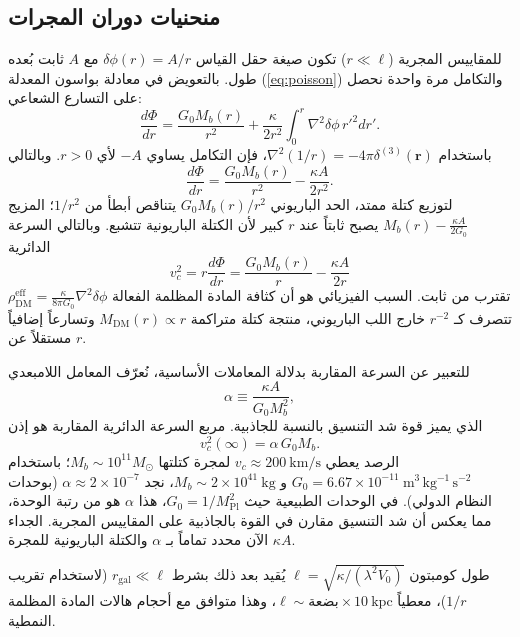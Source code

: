 \documentclass[12pt,a4paper]{article}
\begin{document}
	\subsection{منحنيات دوران المجرات}
	للمقاييس المجرية (\(r \ll \ell\)) تكون صيغة حقل القياس \(\delta\phi(r) = A/r\) مع \(A\) ثابت بُعده طول. بالتعويض في معادلة بواسون المعدلة (\ref{eq:poisson}) والتكامل مرة واحدة نحصل على التسارع الشعاعي:
	\[
	\frac{d\Phi}{dr} = \frac{G_0 M_b(r)}{r^2} + \frac{\kappa}{2r^2} \int_0^r \nabla^2\delta\phi \, r'^2 dr'.
	\]
	باستخدام \(\nabla^2(1/r) = -4\pi\delta^{(3)}(\mathbf{r})\)، فإن التكامل يساوي \(-A\) لأي \(r>0\). وبالتالي
	\[
	\frac{d\Phi}{dr} = \frac{G_0 M_b(r)}{r^2} - \frac{\kappa A}{2r^2}.
	\]
	لتوزيع كتلة ممتد، الحد الباريوني \(G_0 M_b(r)/r^2\) يتناقص أبطأ من \(1/r^2\)؛ المزيج \(M_b(r) - \frac{\kappa A}{2G_0}\) يصبح ثابتاً عند \(r\) كبير لأن الكتلة الباريونية تتشبع. وبالتالي السرعة الدائرية
	\[
	v_c^2 = r\frac{d\Phi}{dr} = \frac{G_0 M_b(r)}{r} - \frac{\kappa A}{2r}
	\]
	تقترب من ثابت. السبب الفيزيائي هو أن كثافة المادة المظلمة الفعالة \(\rho_{\mathrm{DM}}^{\mathrm{eff}} = \frac{\kappa}{8\pi G_0} \nabla^2\delta\phi\) تتصرف كـ \(r^{-2}\) خارج اللب الباريوني، منتجة كتلة متراكمة \(M_{\mathrm{DM}}(r) \propto r\) وتسارعاً إضافياً مستقلاً عن \(r\).
	
	للتعبير عن السرعة المقاربة بدلالة المعاملات الأساسية، نُعرّف المعامل اللامبعدي
	\begin{equation}
		\alpha \equiv \frac{\kappa A}{G_0 M_b^2},
		\label{eq:alpha}
	\end{equation}
	الذي يميز قوة شد التنسيق بالنسبة للجاذبية. مربع السرعة الدائرية المقاربة هو إذن
	\begin{equation}
		v_c^2(\infty) = \alpha\, G_0 M_b.
		\label{eq:vc-squared}
	\end{equation}
	الرصد يعطي \(v_c \approx 200\ \mathrm{km/s}\) لمجرة كتلتها \(M_b \sim 10^{11}M_\odot\)؛ باستخدام \(G_0 = 6.67\times 10^{-11}\ \mathrm{m^3\,kg^{-1}\,s^{-2}}\) و \(M_b \sim 2\times 10^{41}\ \mathrm{kg}\)، نجد \(\alpha \approx 2 \times 10^{-7}\) (بوحدات النظام الدولي). في الوحدات الطبيعية حيث \(G_0 = 1/M_{\mathrm{Pl}}^2\)، هذا \(\alpha\) هو من رتبة الوحدة، مما يعكس أن شد التنسيق مقارن في القوة بالجاذبية على المقاييس المجرية. الجداء \(\kappa A\) الآن محدد تماماً بـ \(\alpha\) والكتلة الباريونية للمجرة.
	
	طول كومبتون \(\ell = \sqrt{\kappa/(\lambda^2 V_0)}\) يُقيد بعد ذلك بشرط \(r_{\mathrm{gal}} \ll \ell\) (لاستخدام تقريب \(1/r\))، معطياً \(\ell \sim \text{بضعة}\times 10\ \mathrm{kpc}\)، وهذا متوافق مع أحجام هالات المادة المظلمة النمطية.
	
\end{document}
